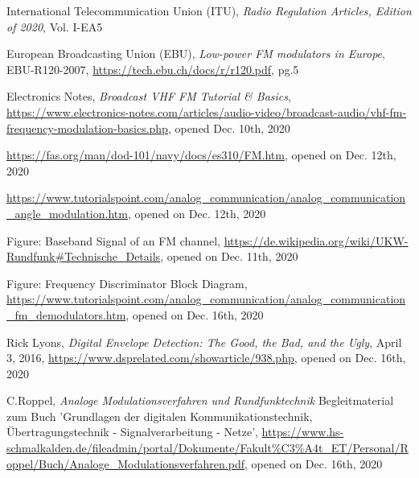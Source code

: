 \documentclass[conference]{IEEEtran}
\begin{document}
%
%
%
\begin{thebibliography}{1}
    International Telecommunication Union (ITU), \emph{Radio Regulation Articles, Edition of 2020}, Vol. I-EA5

    European Broadcasting Union (EBU), \emph{Low-power FM modulators in Europe}, EBU-R120-2007, \url{https://tech.ebu.ch/docs/r/r120.pdf}, pg.5

    Electronics Notes, \emph{Broadcast VHF FM Tutorial \& Basics}, \url{https://www.electronics-notes.com/articles/audio-video/broadcast-audio/vhf-fm-frequency-modulation-basics.php}, opened Dec. 10th, 2020

    \url{https://fas.org/man/dod-101/navy/docs/es310/FM.htm}, opened on Dec. 12th, 2020

    \url{https://www.tutorialspoint.com/analog_communication/analog_communication_angle_modulation.htm}, opened on Dec. 12th, 2020

    Figure: Baseband Signal of an FM channel, \url{https://de.wikipedia.org/wiki/UKW-Rundfunk#Technische_Details}, opened on Dec. 11th, 2020

    Figure: Frequency Discriminator Block Diagram, \url{https://www.tutorialspoint.com/analog_communication/analog_communication_fm_demodulators.htm}, opened on Dec. 16th, 2020

    Rick Lyons, \emph{Digital Envelope Detection: The Good, the Bad, and the Ugly}, April 3, 2016, \url{https://www.dsprelated.com/showarticle/938.php}, opened on Dec. 16th, 2020

    C.Roppel, \emph{Analoge Modulationsverfahren und Rundfunktechnik} Begleitmaterial zum Buch 'Grundlagen der digitalen Kommunikationstechnik, Übertragungstechnik - Signalverarbeitung - Netze', \url{https://www.hs-schmalkalden.de/fileadmin/portal/Dokumente/Fakult%C3%A4t_ET/Personal/Roppel/Buch/Analoge_Modulationsverfahren.pdf}, opened on Dec. 16th, 2020
\end{thebibliography}




\end{document}
